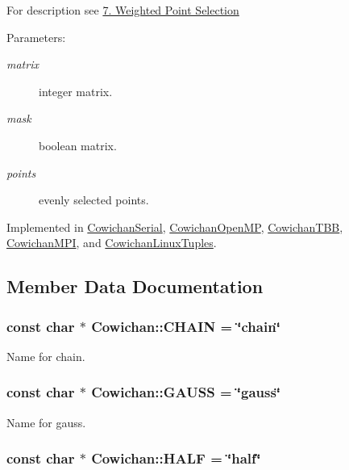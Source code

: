 For description see \hyperlink{index_winnow_sec}{7. Weighted Point Selection} \begin{Desc}
\item[Parameters:]
\begin{description}
\item[{\em matrix}]integer matrix. \item[{\em mask}]boolean matrix. \item[{\em points}]evenly selected points. \end{description}
\end{Desc}


Implemented in \hyperlink{class_cowichan_serial_33daca65431f792c2f4f0e7f8d29fa01}{CowichanSerial}, \hyperlink{class_cowichan_open_m_p_4a518f2b5590d4acd670f333471a380a}{CowichanOpenMP}, \hyperlink{class_cowichan_t_b_b_77178470ef780e0505137dc1d22a85a2}{CowichanTBB}, \hyperlink{class_cowichan_m_p_i_9be48d86fc51ce13ef79d5fe2c8a16e0}{CowichanMPI}, and \hyperlink{class_cowichan_linux_tuples_2b1a77ecbd01ec847cf63fe7ebb50e35}{CowichanLinuxTuples}.

\subsection{Member Data Documentation}
\hypertarget{class_cowichan_17937f5dfe24c46c00a76d48ca70ccaa}{
\subsubsection[{CHAIN}]{\setlength{\rightskip}{0pt plus 5cm}const char $\ast$ {\bf Cowichan::CHAIN} = \char`\"{}chain\char`\"{}}}
\label{class_cowichan_17937f5dfe24c46c00a76d48ca70ccaa}


Name for chain. \hypertarget{class_cowichan_b51b18cab3bd7cab0f3eb5c10f4cce0a}{
\subsubsection[{GAUSS}]{\setlength{\rightskip}{0pt plus 5cm}const char $\ast$ {\bf Cowichan::GAUSS} = \char`\"{}gauss\char`\"{}}}
\label{class_cowichan_b51b18cab3bd7cab0f3eb5c10f4cce0a}


Name for gauss. \hypertarget{class_cowichan_6ef0b7dddca7331c9bfb2acd0ea60088}{
\subsubsection[{HALF}]{\setlength{\rightskip}{0pt plus 5cm}const char $\ast$ {\bf Cowichan::HALF} = \char`\"{}half\char`\"{}}}
\label{class_cowichan_6ef0b7dddca7331c9bfb2acd0ea60088}


